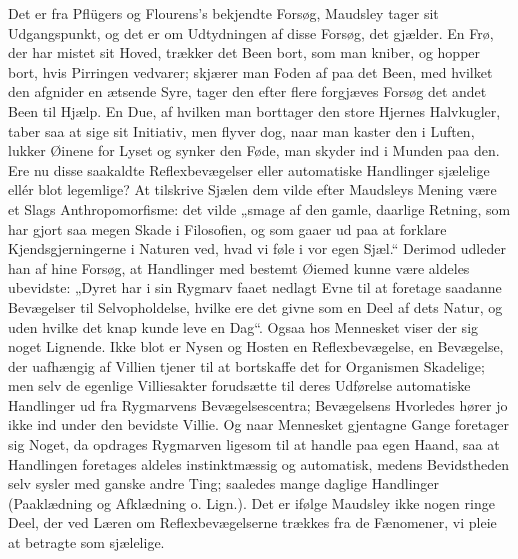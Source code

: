 \documentclass[12pt,a4paper,openany]{book}
\newcommand{\opage}[1]{\marginnote{\footnotesize\textit{[#1]}}}
\begin{document}
Det er fra Pflügers og Flourens's bekjendte Forsøg,
Maudsley tager sit Udgangspunkt, og det er om Udtydningen
af disse Forsøg, det gjælder. En Frø, der har
mistet sit Hoved, trækker det Been bort, som man kniber, og
hopper bort, hvis Pirringen vedvarer; skjærer man Foden af
paa det Been, med hvilket den afgnider en ætsende Syre,
tager den efter flere forgjæves Forsøg det andet Been
til Hjælp. En Due, af hvilken man borttager den store
Hjernes Halvkugler, taber saa at sige sit Initiativ, men flyver
dog, naar man kaster den i Luften, lukker Øinene for Lyset
og synker den Føde, man skyder ind i Munden paa den.
Ere nu disse saakaldte Reflexbevægelser eller automatiske
Handlinger sjælelige ellér blot legemlige? At tilskrive Sjælen
\opage{315}dem vilde efter Maudsleys Mening være et Slags Anthropomorfisme:
det vilde „smage af den gamle, daarlige Retning,
som har gjort saa megen Skade i Filosofien, og som
gaaer ud paa at forklare Kjendsgjerningerne i Naturen ved,
hvad vi føle i vor egen Sjæl.“ Derimod udleder han af
hine Forsøg, at Handlinger med bestemt Øiemed kunne være
aldeles ubevidste: „Dyret har i sin Rygmarv faaet nedlagt
Evne til at foretage saadanne Bevægelser til Selvopholdelse,
hvilke ere det givne som en Deel af dets Natur, og uden
hvilke det knap kunde leve en Dag“. Ogsaa hos Mennesket
viser der sig noget Lignende. Ikke blot er Nysen og Hosten
en Reflexbevægelse, en Bevægelse, der uafhængig af Villien
tjener til at bortskaffe det for Organismen Skadelige; men
selv de egenlige Villiesakter forudsætte til deres Udførelse
automatiske Handlinger ud fra Rygmarvens Bevægelsescentra;
Bevægelsens Hvorledes hører jo ikke ind under den
bevidste Villie. Og naar Mennesket gjentagne Gange foretager
sig Noget, da opdrages Rygmarven ligesom til at
handle paa egen Haand, saa at Handlingen foretages aldeles
instinktmæssig og automatisk, medens Bevidstheden selv sysler
med ganske andre Ting; saaledes mange daglige Handlinger
(Paaklædning og Afklædning o. Lign.). Det er ifølge
Maudsley ikke nogen ringe Deel, der ved Læren om Reflexbevægelserne
trækkes fra de Fænomener, vi pleie at betragte
som sjælelige.
\end{document}
